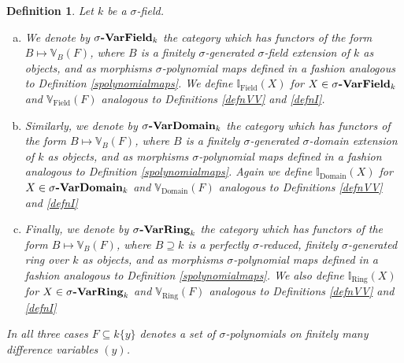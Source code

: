 \documentclass{article}
\def\I{\mathbb{I}}
\def\VV{\mathbb{V}}
\def\s{\sigma}
\newcommand{\catname}[1]{{\normalfont\textbf{#1}}}
\theoremstyle{plain}
\newtheorem{defn}[Satz]{Definition}
\theoremstyle{definition}
\begin{document}
\begin{defn}
Let $k$ be a $\s$-field. 
\begin{enumerate}[(a)]
\item We denote by $\s\text{\catname{-VarField}}_k$ the category which has functors of the form $B \mapsto \VV_B(F)$, where $B$ is a finitely $\s$-generated $\s$-field extension of $k$ as objects,
 and as morphisms $\s$-polynomial maps defined in a fashion analogous to Definition \ref{spolynomialmaps}. We define $\I_{\text{Field}}(X)$ for $X \in \s\text{\catname{-VarField}}_k$ and $\VV_{\text{Field}}(F)$ analogous to Definitions \ref{defnVV} and \ref{defnI}.
\item Similarly, we denote by $\s\text{\catname{-VarDomain}}_k$ the category which has functors of the form $B \mapsto \VV_B(F)$, where $B$ is a finitely $\s$-generated $\s$-domain extension of $k$ as objects,
 and as morphisms $\s$-polynomial maps defined in a fashion analogous to Definition \ref{spolynomialmaps}. Again we define $\I_{\text{Domain}}(X)$ for $X \in \s\text{\catname{-VarDomain}}_k$ and $\VV_{\text{Domain}}(F)$ analogous to Definitions \ref{defnVV} and \ref{defnI}
\item Finally,  we denote by $\s\text{\catname{-VarRing}}_k$ the category which has functors of the form $B \mapsto \VV_B(F)$, where $B \supseteq k$ is a perfectly $\s$-reduced, finitely $\s$-generated ring over $k$ as objects,
 and as morphisms $\s$-polynomial maps defined in a fashion analogous to Definition \ref{spolynomialmaps}. We also define $\I_{\text{Ring}}(X)$ for $X \in \s\text{\catname{-VarRing}}_k$ and $\VV_{\text{Ring}}(F)$ analogous to Definitions \ref{defnVV} and \ref{defnI}
\end{enumerate}
In all three cases $F \subseteq k\{y\}$ denotes a set of $\s$-polynomials on finitely many difference variables $(y)$.
\end{defn}
\end{document}
